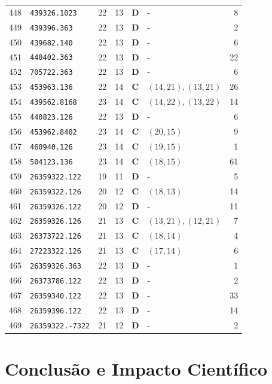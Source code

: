 \documentclass[11pt,a4paper]{article}
\begin{document}
\begin{small}
\begin{longtable}{r l c c c l r}
448 & \texttt{439326.1023} & 22 & 13 & \textbf{D} & - & 8 \\
449 & \texttt{439396.363} & 22 & 13 & \textbf{D} & - & 2 \\
450 & \texttt{439682.140} & 22 & 13 & \textbf{D} & - & 6 \\
451 & \texttt{440402.363} & 22 & 13 & \textbf{D} & - & 22 \\
452 & \texttt{705722.363} & 22 & 13 & \textbf{D} & - & 6 \\
453 & \texttt{453963.136} & 22 & 14 & \textbf{C} & $(14,21), (13,21)$ & 26 \\
454 & \texttt{439562.8168} & 23 & 14 & \textbf{C} & $(14,22), (13,22)$ & 14 \\
455 & \texttt{440823.126} & 22 & 13 & \textbf{D} & - & 6 \\
456 & \texttt{453962.8402} & 23 & 14 & \textbf{C} & $(20,15)$ & 9 \\
457 & \texttt{460940.126} & 23 & 14 & \textbf{C} & $(19,15)$ & 1 \\
458 & \texttt{504123.136} & 23 & 14 & \textbf{C} & $(18,15)$ & 61 \\
459 & \texttt{26359322.122} & 19 & 11 & \textbf{D} & - & 5 \\
460 & \texttt{26359322.126} & 20 & 12 & \textbf{C} & $(18,13)$ & 14 \\
461 & \texttt{26359326.122} & 20 & 12 & \textbf{D} & - & 11 \\
462 & \texttt{26359326.126} & 21 & 13 & \textbf{C} & $(13,21), (12,21)$ & 7 \\
463 & \texttt{26373722.126} & 21 & 13 & \textbf{C} & $(18,14)$ & 4 \\
464 & \texttt{27223322.126} & 21 & 13 & \textbf{C} & $(17,14)$ & 6 \\
465 & \texttt{26359326.363} & 22 & 13 & \textbf{D} & - & 1 \\
466 & \texttt{26373786.122} & 22 & 13 & \textbf{D} & - & 2 \\
467 & \texttt{26359340.122} & 22 & 13 & \textbf{D} & - & 33 \\
468 & \texttt{26359396.122} & 22 & 13 & \textbf{D} & - & 14 \\
469 & \texttt{26359322.-7322} & 21 & 12 & \textbf{D} & - & 2 \\

\end{longtable}
\end{small}

\section{Conclusão e Impacto Científico}
\end{document}
